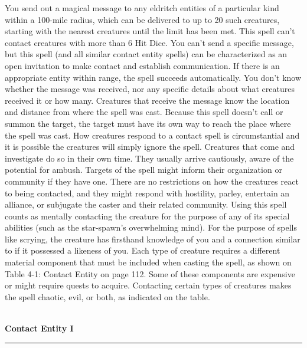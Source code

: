 {You send out a magical message to any eldritch entities of a particular kind within a 100-mile radius, which can be delivered to up to 20 such creatures, starting with the nearest creatures until the limit has been met. This spell can't contact creatures with more than 6 Hit Dice. You can't send a specific message, but this spell (and all similar contact entity spells) can be characterized as an open invitation to make contact and establish communication. If there is an appropriate entity within range, the spell succeeds automatically. You don't know whether the message was received, nor any specific details about what creatures received it or how many. Creatures that receive the message know the location and distance from where the spell was cast. Because this spell doesn't  call or summon the target, the target must have its own way to reach the place where the spell was cast.  How creatures respond to a contact spell is circumstantial and it is possible the creatures will simply ignore the spell. Creatures that come and investigate do so in their own time. They usually arrive cautiously, aware of the potential for ambush. Targets of the spell might inform their organization or community if they have one. There are no restrictions on how the creatures react to being contacted, and they might respond with hostility, parley, entertain an alliance, or subjugate the caster and their related community. Using this spell counts as mentally contacting the creature for the purpose of any of its special abilities (such as the star-spawn's overwhelming mind). For the purpose of spells like scrying, the creature has firsthand knowledge of you and a connection similar to if it possessed a likeness of you.  Each type of creature requires a different material component that must be included when casting the spell, as shown on Table 4-1: Contact Entity on page 112. Some of these components are expensive or might require quests to acquire. Contacting certain types of creatures makes the spell chaotic, evil, or both, as indicated on the table.\\\\

{\centering\bf Contact Entity I\hrule}

}

